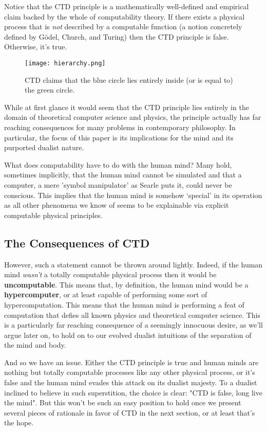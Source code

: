 \documentclass[11pt]{diazessay} %
\begin{document}
		Notice that the CTD principle is a mathematically well-defined and empirical claim backed by the whole of computability theory. If there exists a physical process that is \emph{not} described by a computable function (a notion concretely defined by Gödel, Church, and Turing) then the CTD principle is false. Otherwise, it's true.

		\begin{figure}[H]
			\centering
			\texttt{[image: hierarchy.png]}
			\captionsetup{justification=centering,margin=2cm}
			\caption{CTD claims that the blue circle lies entirely inside (or is equal to) the green circle.}
		\end{figure}

		While at first glance it would seem that the CTD principle lies entirely in the domain of theoretical computer science and physics, the principle actually has far reaching consequences for many problems in contemporary philosophy. In particular, the focus of this paper is its implications for the mind and its purported dualist nature.

		What does computability have to do with the human mind? Many hold, sometimes implicitly, that the human mind cannot be simulated and that a computer, a mere 'symbol manipulator' as Searle puts it, could never be conscious. This implies that the human mind is somehow `special' in its operation as all other phenomena we know of seems to be explainable via explicit computable physical principles.

	\subsection{The Consequences of CTD}
		However, such a statement cannot be thrown around lightly. Indeed, if the human mind \emph{wasn't} a totally computable physical process then it would be \textbf{uncomputable}. This means that, by definition, the human mind would be a \textbf{hypercomputer}, or at least capable of performing some sort of hypercomputation. This means that the human mind is performing a feat of computation that defies all known physics and theoretical computer science. This is a particularly far reaching consequence of a seemingly innocuous desire, as we'll argue later on, to hold on to our evolved dualist intuitions of the separation of the mind and body.
		
		And so we have an issue. Either the CTD principle is true and human minds are nothing but totally computable processes like any other physical process, or it's false and the human mind evades this attack on its dualist majesty. To a dualist inclined to believe in such superstition, the choice is clear: "CTD is false, long live the mind". But this won't be such an easy position to hold once we present several pieces of rationale in favor of CTD in the next section, or at least that's the hope.
		
\end{document}
